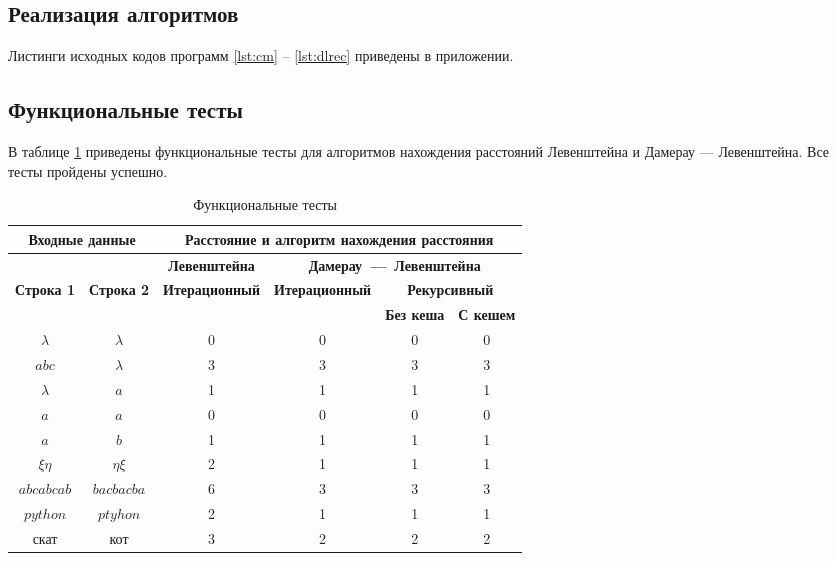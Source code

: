 \subsection{Реализация алгоритмов}

Листинги исходных кодов программ \ref{lst:cm} -- \ref{lst:dlrec} приведены в приложении.

\subsection{Функциональные тесты}

В таблице \ref{tab:ft} приведены функциональные тесты для алгоритмов нахождения расстояний Левенштейна и Дамерау --- Левенштейна. Все тесты пройдены успешно.

\begin{table}[H]
	\small
	\begin{center}
		\begin{threeparttable}
		\caption{Функциональные тесты}
		\label{tab:ft}
		\begin{tabular}{|c|c|c|c|c|c|}
			\hline
			\multicolumn{2}{|c|}{\bfseries Входные данные}
			& \multicolumn{4}{c|}{\bfseries Расстояние и алгоритм нахождения расстояния} \\ 
			\hline 
			&
			& \multicolumn{1}{c|}{\bfseries Левенштейна} 
			& \multicolumn{3}{c|}{\bfseries Дамерау~---~Левенштейна} \\ \cline{3-6}
			
			\bfseries Строка 1 & \bfseries Строка 2 & \bfseries Итерационный & \bfseries Итерационный
			
			& \multicolumn{2}{c|}{\bfseries Рекурсивный} \\ \cline{5-6}
			& & & & \bfseries Без кеша & \bfseries С кешем \\
			\hline
			$\lambda$ & $\lambda$ & 0 & 0 & 0 & 0 \\
			\hline
			$abc$ & $\lambda$ & 3 & 3 & 3 & 3 \\
			\hline
			$\lambda$ & $a$ & 1 & 1 & 1 & 1 \\
			\hline
			$a$ & $a$ & 0 & 0 & 0 & 0 \\
			\hline
			$a$ & $b$ & 1 & 1 & 1 & 1 \\
			\hline
			$\xi\eta$ & $\eta\xi$ & 2 & 1 & 1 & 1 \\
			\hline
			$abcabcab$ & $bacbacba$ & 6 & 3 & 3 & 3 \\
			\hline
			$python$ & $ptyhon$ & 2 & 1 & 1 & 1 \\
			\hline
			скат & кот & 3 & 2 & 2 & 2 \\
			\hline
		\end{tabular}	
		\end{threeparttable}
	\end{center}
\end{table}

